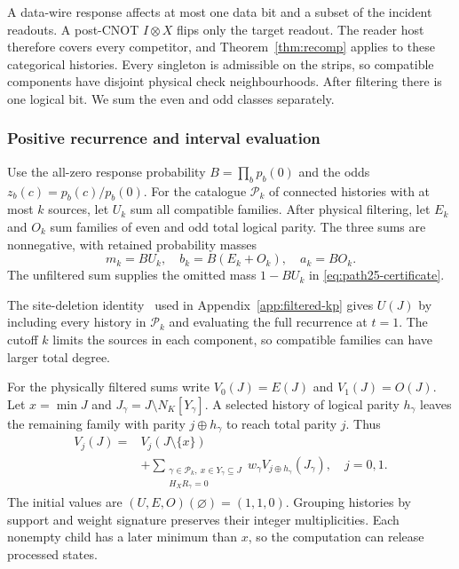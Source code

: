 \documentclass[10pt,twocolumn]{article}
\theoremstyle{definition}
\begin{document}
A data-wire response affects at most one data bit and a subset of the
incident readouts. A post-CNOT $I\otimes X$ flips only the target
readout. The reader host therefore covers every competitor, and
Theorem~\ref{thm:recomp} applies to these categorical histories.
Every singleton is admissible on the strips, so compatible
components have disjoint physical check neighbourhoods. After
filtering there is one logical bit. We sum the even and odd classes
separately.

\subsubsection{Positive recurrence and interval evaluation}
Use the all-zero response probability $B=\prod_b p_b(0)$ and the odds
$z_b(c)=p_b(c)/p_b(0)$. For the catalogue $\mathcal P_k$ of connected
histories with at most $k$ sources, let $U_k$ sum all compatible
families. After physical filtering, let $E_k$ and $O_k$ sum families
of even and odd total logical parity. The three sums are nonnegative,
with retained probability masses
\begin{equation}\label{eq:strip-three-channel}
 m_k=BU_k,\quad b_k=B(E_k+O_k),\quad a_k=BO_k.
\end{equation}
The unfiltered sum supplies the omitted mass $1-BU_k$ in
\eqref{eq:path25-certificate}.

The site-deletion identity~\cite[Eq.~(2.42)]{BFP10} used in
Appendix~\ref{app:filtered-kp} gives $U(J)$ by including every history
in $\mathcal P_k$ and evaluating the full recurrence at $t=1$. The cutoff $k$ limits the sources in each
component, so compatible families can have larger total degree.

For the physically filtered sums write $V_0(J)=E(J)$ and $V_1(J)=O(J)$.
Let $x=\min J$ and $J_\gamma=J\setminus N_K[Y_\gamma]$. A selected
history of logical parity $h_\gamma$ leaves the remaining family
with parity $j\oplus h_\gamma$ to reach total parity $j$. Thus
\begin{equation}\label{eq:strip-dag}
\begin{split}
 V_j(J)={}&V_j(J\setminus\{x\})\\
 &+\sum_{\substack{\gamma\in\mathcal P_k,\ x\in Y_\gamma\subseteq J\\H_XR_\gamma=0}}
       w_\gamma V_{j\oplus h_\gamma}(J_\gamma),\quad j=0,1 .
\end{split}
\end{equation}
The initial values are $(U,E,O)(\varnothing)=(1,1,0)$.
Grouping histories by support and weight signature preserves their
integer multiplicities. Each nonempty child has a later minimum than
$x$, so the computation can release processed states.
\end{document}
